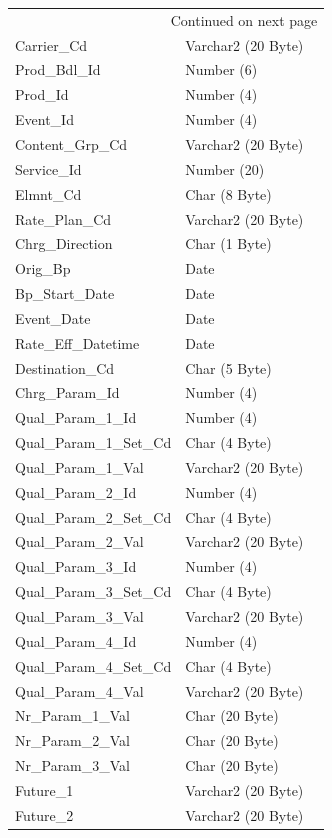 \documentclass[12pt,twoside]{article}
\begin{document}
\begin{longtable}{l|l|l}
\hline
\endhead
\hline\multicolumn{3}{r}{Continued on next page} \\
\endfoot
\endlastfoot
\hline
Carrier\_Cd & Varchar2 (20 Byte) & \\
Prod\_Bdl\_Id & Number (6) & \\
Prod\_Id & Number (4) & \\
Event\_Id & Number (4) & \\
Content\_Grp\_Cd & Varchar2 (20 Byte) & \\
Service\_Id & Number (20) & \\
Elmnt\_Cd & Char (8 Byte) & \\
Rate\_Plan\_Cd & Varchar2 (20 Byte) & \\
Chrg\_Direction & Char (1 Byte) & \\
Orig\_Bp & Date & \\
Bp\_Start\_Date & Date & \\
Event\_Date & Date & \\
Rate\_Eff\_Datetime & Date & \\
Destination\_Cd & Char (5 Byte) & \\
Chrg\_Param\_Id & Number (4) & \\
Qual\_Param\_1\_Id & Number (4) & \\
Qual\_Param\_1\_Set\_Cd & Char (4 Byte) & \\
Qual\_Param\_1\_Val & Varchar2 (20 Byte) & \\
Qual\_Param\_2\_Id & Number (4) & \\
Qual\_Param\_2\_Set\_Cd & Char (4 Byte) & \\
Qual\_Param\_2\_Val & Varchar2 (20 Byte) & \\
Qual\_Param\_3\_Id & Number (4) & \\
Qual\_Param\_3\_Set\_Cd & Char (4 Byte) & \\
Qual\_Param\_3\_Val & Varchar2 (20 Byte) & \\
Qual\_Param\_4\_Id & Number (4) & \\
Qual\_Param\_4\_Set\_Cd & Char (4 Byte) & \\
Qual\_Param\_4\_Val & Varchar2 (20 Byte) & \\
Nr\_Param\_1\_Val & Char (20 Byte) & \\
Nr\_Param\_2\_Val & Char (20 Byte) & \\
Nr\_Param\_3\_Val & Char (20 Byte) & \\
Future\_1 & Varchar2 (20 Byte) & \\
Future\_2 & Varchar2 (20 Byte) & \\

\end{longtable}
\end{document}
